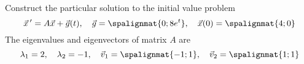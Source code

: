 \documentclass[12pt]{exam}
\begin{document}
    


\newpage

\begin{questions}


    \question[10]  Construct the particular solution to the initial value problem $$\vec x \, ' = A \vec x + \vec g(t), \quad \vec g = \spalignmat{0;8e^{t}}, \quad \vec x(0) = \spalignmat{4;0}$$ The eigenvalues and eigenvectors of matrix $A$ are
    $$ \lambda_1 = 2, \quad \lambda_2 = -1, \quad \vec v_1 = \spalignmat{-1;1}, \quad \vec v_2 = \spalignmat{1;1}$$


\end{questions}
\end{document}
